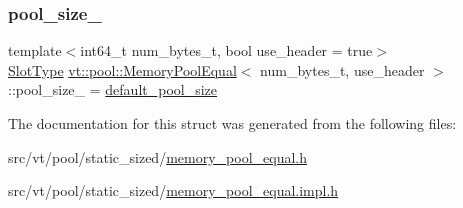 \subsubsection{\texorpdfstring{pool\+\_\+size\+\_\+}{pool\_size\_}}
{\footnotesize\ttfamily template$<$int64\+\_\+t num\+\_\+bytes\+\_\+t, bool use\+\_\+header = true$>$ \\
\hyperlink{structvt_1_1pool_1_1_memory_pool_equal_af05a2c24c95c666b20e3758745be746b}{Slot\+Type} \hyperlink{structvt_1_1pool_1_1_memory_pool_equal}{vt\+::pool\+::\+Memory\+Pool\+Equal}$<$ num\+\_\+bytes\+\_\+t, use\+\_\+header $>$\+::pool\+\_\+size\+\_\+ = \hyperlink{structvt_1_1pool_1_1_memory_pool_equal_a8daca02e94e9ab587670808525561c71}{default\+\_\+pool\+\_\+size}\hspace{0.3cm}{\ttfamily [private]}}



The documentation for this struct was generated from the following files\+:\begin{DoxyCompactItemize}
\item 
src/vt/pool/static\+\_\+sized/\hyperlink{memory__pool__equal_8h}{memory\+\_\+pool\+\_\+equal.\+h}\item 
src/vt/pool/static\+\_\+sized/\hyperlink{memory__pool__equal_8impl_8h}{memory\+\_\+pool\+\_\+equal.\+impl.\+h}\end{DoxyCompactItemize}
